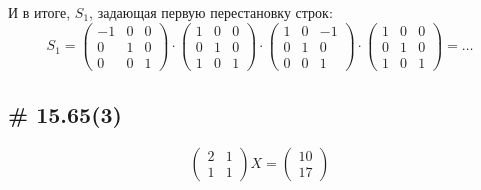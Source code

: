 \documentclass[a4paper,12pt]{article}
\begin{document}
\begin{solution}
    И в итоге, $S_1$, задающая первую перестановку строк:
    \[
      S_1 = \begin{pmatrix}
          -1 & 0 & 0\\
          0 & 1 & 0\\
          0 & 0 & 1
        \end{pmatrix}
      \cdot \begin{pmatrix}
          1 & 0 & 0\\
          0 & 1 & 0\\
          1 & 0 & 1
        \end{pmatrix}
      \cdot \begin{pmatrix}
          1 & 0 & -1\\
          0 & 1 & 0\\
          0 & 0 & 1
        \end{pmatrix}
      \cdot \begin{pmatrix}
          1 & 0 & 0\\
          0 & 1 & 0\\
          1 & 0 & 1
        \end{pmatrix}
      = \ldots
    \]
  \end{solution}
  
  
  
  \subsection{\# 15.65(3)}
  
  \[
    \begin{pmatrix}
      2 & 1\\
      1 & 1
    \end{pmatrix} X = \begin{pmatrix}
      10\\
      17
    \end{pmatrix}
  \]
  
\end{document}
